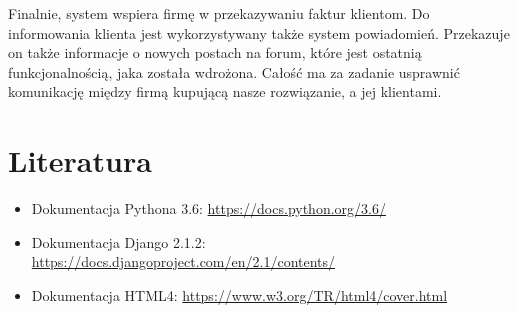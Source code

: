 \documentclass[12pt]{article}
\begin{document}
Finalnie, system wspiera firmę w przekazywaniu faktur klientom. Do informowania klienta jest wykorzystywany także system powiadomień. Przekazuje on także informacje o nowych postach na forum, które jest ostatnią funkcjonalnością, jaka została wdrożona. Całość ma za zadanie usprawnić komunikację między firmą kupującą nasze rozwiązanie, a jej klientami.

\section{Literatura}
\begin{itemize}
	\item Dokumentacja Pythona 3.6: \url{https://docs.python.org/3.6/}
	\item Dokumentacja Django 2.1.2: \url{https://docs.djangoproject.com/en/2.1/contents/}
	\item Dokumentacja HTML4: \url{https://www.w3.org/TR/html4/cover.html}
\end{itemize}
\end{document}
